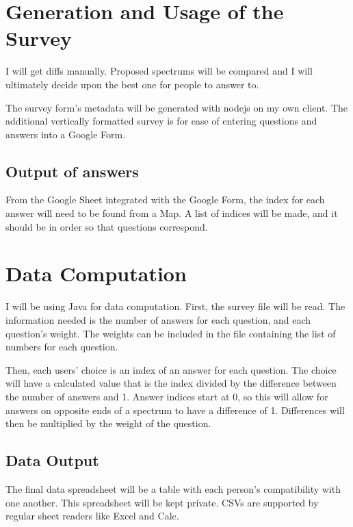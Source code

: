 \documentclass[12pt]{article}
\begin{document}
\section{Generation and Usage of the Survey}
I will get diffs manually. Proposed spectrums will be compared and I will
ultimately decide upon the best one for people to answer to.

The survey form's metadata will be generated with nodejs on my own client. The
additional vertically formatted survey is for ease of entering questions and
answers into a Google Form.

\subsection{Output of answers}
From the Google Sheet integrated with the Google Form, the index for each
answer will need to be found from a Map. A list of indices will be made, and it
should be in order so that questions correspond.

\section{Data Computation}
I will be using Java for data computation. First, the survey file will be read.
The information needed is the number of answers for each question, and each
question's weight. The weights can be included in the file containing the list
of numbers for each question.

Then, each users' choice is an index of an answer for each question. The choice
will have a calculated value that is the index divided by the difference between
the number of answers and 1. Answer indices start at 0, so this will allow for
answers on opposite ends of a spectrum to have a difference of 1. Differences
will then be multiplied by the weight of the question.

\subsection{Data Output}
The final data spreadsheet will be a table with each person's compatibility
with one another. This spreadsheet will be kept private. CSVs are supported by
regular sheet readers like Excel and Calc.
\end{document}
